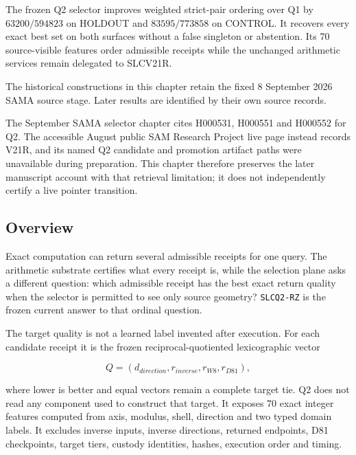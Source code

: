\label{viii-ch07-ordinal-selection-and-the-delegated-exact-engine}

The frozen Q2 selector improves weighted strict-pair ordering over Q1 by $63200/594823$ on HOLDOUT and $83595/773858$ on CONTROL. It recovers every exact best set on both surfaces without a false singleton or abstention. Its 70 source-visible features order admissible receipts while the unchanged arithmetic services remain delegated to SLCV21R.

The historical constructions in this chapter retain the fixed 8 September 2026 SAMA source stage. Later results are identified by their own source records.

The September SAMA selector chapter cites H000531, H000551 and H000552
for Q2. The accessible August public SAM Research Project live page
instead records V21R, and its named Q2 candidate and promotion artifact
paths were unavailable during preparation. This chapter therefore
preserves the later manuscript account with that retrieval limitation;
it does not independently certify a live pointer transition.



\subsection{Overview}\label{viii-ch07-overview}

Exact computation can return several admissible receipts for one query.
The arithmetic substrate certifies what every receipt is, while the
selection plane asks a different question: which admissible receipt has
the best exact return quality when the selector is permitted to see only
source geometry? \texttt{SLCQ2-RZ} is the frozen current answer to that
ordinal question.

The target quality is not a learned label invented after execution. For
each candidate receipt it is the frozen reciprocal-quotiented
lexicographic vector

\[
Q=(d_{direction},r_{inverse},r_{W8},r_{D81}),
\]

where lower is better and equal vectors remain a complete target tie. Q2
does not read any component used to construct that target. It exposes 70
exact integer features computed from axis, modulus, shell, direction and
two typed domain labels. It excludes inverse inputs, inverse directions,
returned endpoints, D81 checkpoints, target tiers, custody identities,
hashes, execution order and timing.

